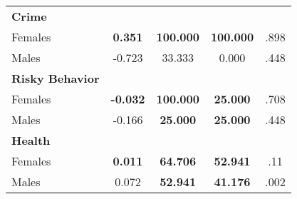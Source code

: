 \begin{tabular}{l c c c c}
\midrule
\textbf{Crime} & & & & \\
\quad Females &  \textbf{    0.351} & \textbf{  100.000} & \textbf{  100.000} & .898 \\
\quad Males &     -0.723 &    33.333 &     0.000 & .448 \\
\midrule
\textbf{Risky Behavior} & & & & \\
\quad Females &  \textbf{   -0.032} & \textbf{  100.000} & \textbf{   25.000} & .708 \\
\quad Males &     -0.166 & \textbf{   25.000} & \textbf{   25.000} & .448 \\
\midrule
\textbf{Health} & & & & \\
\quad Females &  \textbf{    0.011} & \textbf{   64.706} & \textbf{   52.941} & .11 \\
\quad Males &      0.072 & \textbf{   52.941} & \textbf{   41.176} & .002 \\
\bottomrule
\end{tabular}
